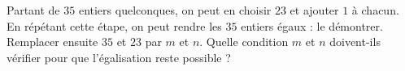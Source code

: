 Partant de $35$ entiers quelconques, on peut en choisir $23$ et ajouter $1$ à chacun. En répétant cette étape, on peut rendre les $35$ entiers égaux : le démontrer. Remplacer ensuite $35$ et $23$ par $m$ et $n$. Quelle condition $m$ et $n$ doivent-ils vérifier pour que l'égalisation reste possible ?
